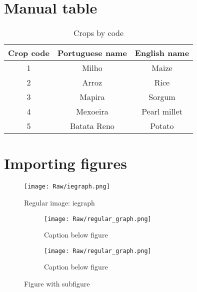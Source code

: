 \documentclass{article}
\begin{document}
 \section{Manual table}

\begin{table}[h!]                                                                       %
	\caption{Crops by code}                                                             %
	\centering                                                                          %
	\begin{tabular}{ccc}
		\hline\hline
		\textbf{Crop code} & \textbf{Portuguese name} & \textbf{English name} \\
		\hline
		1 &	Milho & Maize \\
		2 &	Arroz & Rice\\
		3 &	Mapira & Sorgum\\
		4 &	Mexoeira & Pearl millet\\
		5 &	Batata Reno & Potato \\
		\hline\hline
	\end{tabular}
\end{table}

\section{Importing figures}

	 \begin{figure}[H]
		\centering
		\texttt{[image: Raw/iegraph.png]}
		\caption{Regular image: iegraph}  	%
		\label{fig:my_label}                %
	\end{figure}

	\begin{figure}[H]
	\centering
	\begin{subfigure}[b]{0.49\textwidth}                                  %
		\texttt{[image: Raw/regular\_graph.png]}
		\caption{Caption below figure}                                      %
	\end{subfigure}
	\begin{subfigure}[b]{0.49\textwidth}                                  %
		\texttt{[image: Raw/regular\_graph.png]}    %
		\caption{Caption below figure}                                              %
	\end{subfigure}
	\caption{Figure with subfigure}
\end{figure}
\end{document}
